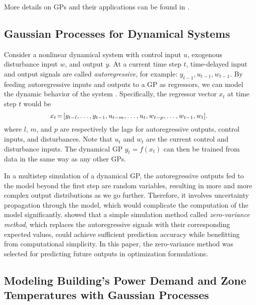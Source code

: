 More details on GPs and their applications can be found in \cite{Rasmussen2006}.

\subsection{Gaussian Processes for Dynamical Systems}
\label{SS:intro-gp:control}

Consider a nonlinear dynamical system with control input \(u\), exogenous disturbance input \(w\), and output \(y\).
At a current time step $t$, time-delayed input and output signals are called \emph{autoregressive}, for example: $y_{t-1}, u_{t-1}, w_{t-1}$.
By feeding autoregressive inputs and outputs to a GP as regressors, we can model the dynamic behavior of the system \cite{Kocijan2016}.
Specifically, the regressor vector $x_{t}$ at time step $t$ would be
\begin{equation*}
x_{t}\!=\![y_{t-l}, \dots, y_{t-1}, u_{t-m}, \dots, u_t, w_{t-p}, \dots, w_{t-1}, w_t] \text.
\end{equation*}
where \(l\), \(m\), and \(p\) are respectively the lags for autoregressive outputs, control inputs, and disturbances.
Note that \(u_t\) and \(w_t\) are the current control and disturbance inputs.
The dynamical GP
\begin{math}
y_{t} = f(x_t)
\end{math}
can then be trained from data in the same way as any other GPs.

In a multistep simulation of a dynamical GP, the autoregressive outputs fed to the model beyond the first step are random variables, resulting in more and more complex output distributions as we go further.
Therefore, it involves uncertainty propagation through the model, which would complicate the computation of the model significantly.
\cite{nghiemetal16gp} showed that a simple simulation method called \emph{zero-variance method}, which replaces the autoregressive signals with their corresponding expected values, could achieve sufficient prediction accuracy while benefitting from computational simplicity.
In this paper, the zero-variance method was selected for predicting future outputs in optimization formulations.


\subsection{Modeling Building's Power Demand and Zone Temperatures with Gaussian Processes}
\label{sec:gp:bldg-modeling}

